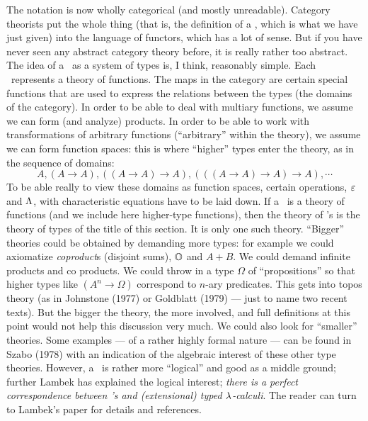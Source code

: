 The notation is now wholly categorical (and mostly unreadable). Category theorists put the whole thing (that is, the definition of a \ccc, which is what we have just given) into the language of functors, which has a lot of sense. But if you have never seen any abstract category theory before, it is really rather too abstract. The idea of a \ccc\ as a system of types is, I think, reasonably simple. Each \ccc\ represents a theory of functions. The maps in the category are certain special functions that are used to express the relations between the types (the domains of the category). In order to
be able to deal with multiary functions, we assume we can form
(and analyze) products. In order to be able to work with transformations of arbitrary functions (``arbitrary'' within the theory), we assume we can form function spaces: this is where ``higher'' types enter the theory, as in the sequence of domains:
$$
A, (A \to A), ((A \to A) \to A), (((A \to A) \to A) \to A), \cdots
$$
To be able really to view these domains as function spaces, certain operations, $\varepsilon$ and $\Lambda$, with characteristic equations have to be laid down.
If a \ccc\ is a theory of functions (and we include here higher-type functions), then the theory of \ccc's is the theory of types of the title of this section. It is only one such theory. ``Bigger'' theories could be obtained by demanding more types: for example we could axiomatize {\it coproduct}s (disjoint sums), ${\mathbb O}$ and $A+ B$. We could demand infinite products and co products. We could throw in a type $\Omega$ of ``propositions'' so that higher types like $(A^n \to \Omega)$ correspond to $n$-ary predicates. This gets into topos theory (as in Johnstone (1977) or Goldblatt (1979) --- just to name two recent texts). But the bigger the theory, the more involved, and full definitions at this point would not help this discussion very much.
We could also look for ``smaller'' theories. Some examples --- of a rather highly formal nature --- can be found in Szabo (1978) with an indication of the algebraic interest of these other type theories. However, a \ccc\ is rather more ``logical'' and good as a middle ground; further Lambek has explained the logical interest; {\it there is a perfect correspondence between \ccc's and (extensional) typed $\lambda$-calculi}. The reader can turn to Lambek's paper for details and references.

\def\means#1{\llbracket\, #1 \,\rrbracket}

